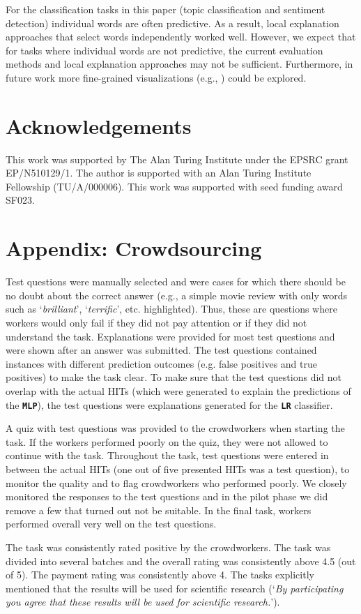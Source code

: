 \documentclass[11pt,a4paper]{article}
\begin{document}
For the classification tasks  in this paper (topic classification and sentiment detection) individual words are often predictive. As a result, local explanation approaches that select words independently worked well. However, we expect that for tasks where individual words are not predictive, the current evaluation methods and local explanation approaches may not be sufficient.
Furthermore, in future work more fine-grained visualizations (e.g., \citet{handler2016visualizing}) could be explored.


\section*{Acknowledgements}
This work was supported by The Alan Turing Institute under the EPSRC grant EP/N510129/1.
The author is supported  with an Alan Turing Institute Fellowship (TU/A/000006). This work was supported with  seed funding award SF023.

%
%



\appendix
\section{Appendix: Crowdsourcing}
\label{appendix_crowdsourcing}
Test questions were  manually selected and were cases for which there should be no doubt about the correct answer (e.g., a simple movie review with only words such as `\textit{brilliant}', `\textit{terrific}', etc. highlighted). Thus, these are questions where workers would only fail if they did not pay attention or if they did not understand the task.
Explanations were  provided for most test questions and were shown after an answer was submitted. The test questions contained instances with different prediction outcomes (e.g. false positives and true positives) to make the task clear. To make sure that the test questions  did not overlap with the actual HITs (which were generated to explain the predictions of the \textbf{\texttt{MLP}}), the test questions were explanations generated for the \textbf{\texttt{LR}} classifier.

A quiz with test questions was provided to the crowdworkers when starting the task. If the workers performed poorly on the quiz, they were not allowed to continue with the task. Throughout the task, test questions were entered in between the actual HITs (one out of five presented HITs was a test question), to monitor the quality and to flag crowdworkers who performed poorly. We closely monitored the responses to the test questions and in the pilot phase we did remove a few that turned out not be suitable. In the final task, workers performed overall very well on the test questions. 

The task was consistently rated positive by the crowdworkers. The task was divided into several batches and the overall rating was consistently above 4.5 (out of 5). The payment rating was consistently above 4. 
The tasks  explicitly mentioned that the results will be used for scientific research (`\textit{By participating you agree that these results will be used for scientific research.}').
\end{document}
